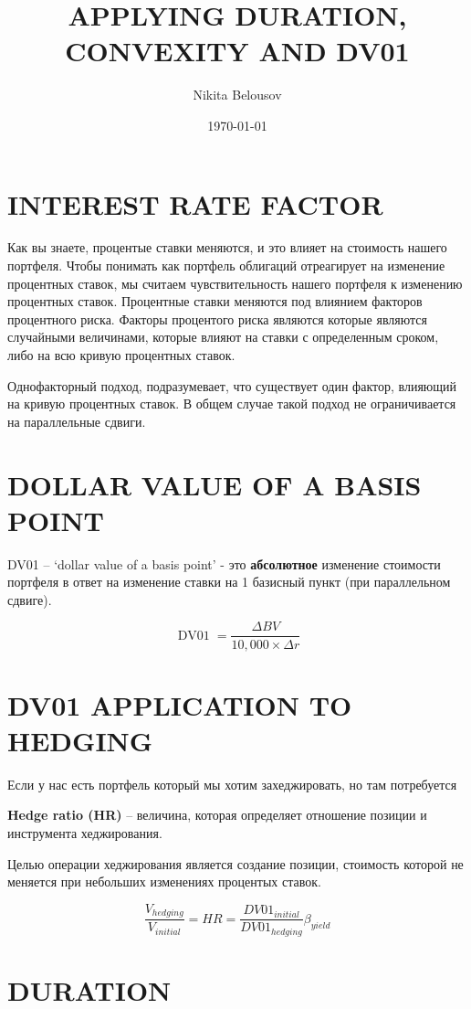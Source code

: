 \documentclass[a4paper,12pt]{article}
\title{APPLYING DURATION, CONVEXITY AND DV01}
\author{Nikita Belousov}
\date{\today}
\begin{document}
\maketitle
\section{INTEREST RATE FACTOR}

Как вы знаете, процентые ставки меняются, и это влияет на стоимость нашего портфеля.
Чтобы понимать как портфель облигаций отреагирует на изменение процентных ставок, мы считаем чувствительность нашего портфеля к изменению процентных ставок.
Процентные ставки меняются под влиянием факторов процентного риска. Факторы процентого риска являются которые являются случайными величинами, которые влияют на ставки с определенным сроком, либо на всю кривую процентных ставок.

Однофакторный подход, подразумевает, что существует один фактор,
влияющий на кривую процентных ставок. В общем случае такой подход не ограничивается на параллельные сдвиги.


\section{DOLLAR VALUE OF A BASIS POINT}

DV01 -- `dollar value of a basis point' - это \textbf{абсолютное} изменение стоимости портфеля в ответ на изменение ставки на 1 базисный пункт (при параллельном сдвиге).

\[ \operatorname{DV01} = \frac{\Delta BV}{10,000 \times \Delta r}  \]

\section{DV01 APPLICATION TO HEDGING}

Если у нас есть портфель который мы хотим захеджировать, но там потребуется

\textbf{Hedge ratio (HR)} -- величина, которая определяет отношение  позиции и инструмента хеджирования.

Целью операции хеджирования является создание позиции, стоимость которой не меняется при небольших изменениях процентых ставок.

\[ \frac{V_{hedging}}{V_{initial}} = HR = \frac{DV01_{initial}}{DV01_{hedging}}\beta_{yield}  \]

\section{DURATION}
\end{document}
